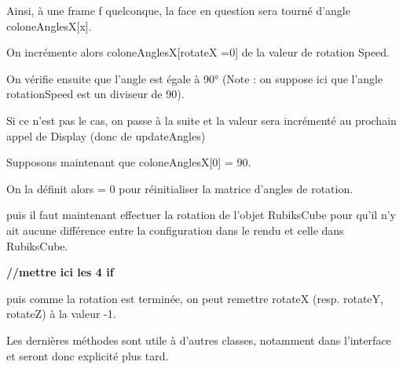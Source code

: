 Ainsi, à une frame f quelconque, la face en question sera tourné d’angle coloneAnglesX[x].

On incrémente alors coloneAnglesX[rotateX =0] de la valeur de rotation Speed.

On vérifie ensuite que l’angle est égale à 90° (Note : on suppose ici que l’angle rotationSpeed est un diviseur de 90).

Si ce n’est pas le cas, on passe à la suite et la valeur sera incrémenté au prochain appel de Display (donc de updateAngles)

Supposons maintenant que coloneAnglesX[0] = 90.

On la définit alors = 0 pour réinitialiser la matrice d’angles de rotation.

puis il faut maintenant effectuer la rotation de l’objet RubiksCube pour qu’il n’y ait aucune différence entre la configuration dans le rendu et celle dans RubiksCube.

\textbf{//mettre ici les 4 if}

puis comme la rotation est terminée, on peut remettre rotateX (resp. rotateY, rotateZ)  à la valeur -1.

Les dernières méthodes sont utile à d’autres classes, notamment dans l’interface et seront donc explicité plus tard.

